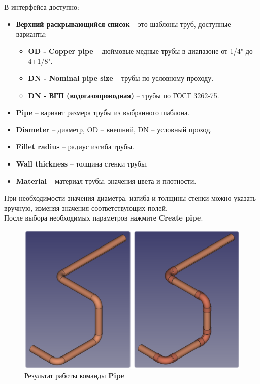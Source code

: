 \documentclass[a4paper,12pt]{article}
\begin{document}
В интерфейса доступно:
\begin{itemize}
	\item \textbf{Верхний раскрывающийся список} -- это шаблоны труб, доступные варианты:
	\begin{itemize}
		\item \textbf{OD - Copper pipe} -- дюймовые медные трубы в диапазоне от 1/4" до 4+1/8".
		\item \textbf{DN - Nominal pipe size} -- трубы по условному проходу.
		\item \textbf{DN - ВГП (водогазопроводная)} -- трубы по ГОСТ 3262-75.
	\end{itemize}
	\item \textbf{Pipe} -- вариант размера трубы из выбранного шаблона.
	\item \textbf{Diameter} -- диаметр, OD -- внешний, DN -- условный проход.
	\item \textbf{Fillet radius} -- радиус изгиба трубы.
	\item \textbf{Wall thickness} -- толщина стенки трубы.
	\item \textbf{Material} -- материал трубы, значения цвета и плотности.
\end{itemize}

При необходимости значения диаметра, изгиба и толщины стенки можно указать вручную, изменяя значения соответствующих полей.\\

После выбора необходимых параметров нажмите \textbf{Create pipe}.

\begin{figure}[htp]
	\centering
	\includegraphics[width=1\textwidth]{img/pipe_result.png}
	\caption{Результат работы команды \textbf{Pipe}}
	\label{sec:pipe_result}
\end{figure}
\end{document}
